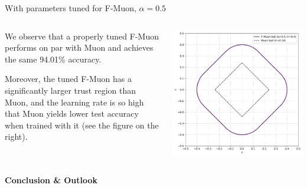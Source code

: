\documentclass[fontsize=10pt]{beamer}
\begin{document}
\begin{frame}[fragile]
\begin{columns}[T]
\begin{column}{0.30\textwidth}
\begin{columns}[T,totalwidth=\textwidth]
\begin{column}{0.48\textwidth}
        {\centering With parameters tuned for F-Muon, $\alpha = 0.5$\par}
      \end{column}
    \end{columns}\vspace{1em}

\begin{columns}[T,totalwidth=\textwidth]
  \begin{column}{0.47\textwidth}
    \setlength{\parskip}{0.7em}
\setlength{\parindent}{0pt}
\Large
    We observe that a properly tuned F-Muon performs on par with Muon and achieves the same 94.01\% accuracy. 
    
    Moreover, the tuned F-Muon has a significantly larger trust region than Muon, and the learning rate is so high that Muon yields lower test accuracy when trained with it (see the figure on the right).
  \end{column}
  \begin{column}{0.49\textwidth}
    \includegraphics[width=\linewidth]{fstardual_cifar.pdf}
    \centering
  \end{column}
\end{columns}

\vspace{0.5em}
\textbf{\Huge\color{Zen}Conclusion \& Outlook}\\[0.6em]


\end{column}
\end{columns}
\end{frame}
\end{document}
